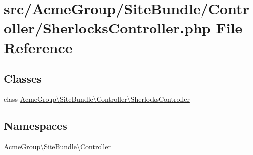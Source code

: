 \hypertarget{_sherlocks_controller_8php}{\section{src/\+Acme\+Group/\+Site\+Bundle/\+Controller/\+Sherlocks\+Controller.php File Reference}
\label{_sherlocks_controller_8php}
}
\subsection*{Classes}
\begin{DoxyCompactItemize}
\item 
class \hyperlink{class_acme_group_1_1_site_bundle_1_1_controller_1_1_sherlocks_controller}{Acme\+Group\textbackslash{}\+Site\+Bundle\textbackslash{}\+Controller\textbackslash{}\+Sherlocks\+Controller}
\end{DoxyCompactItemize}
\subsection*{Namespaces}
\begin{DoxyCompactItemize}
\item 
 \hyperlink{namespace_acme_group_1_1_site_bundle_1_1_controller}{Acme\+Group\textbackslash{}\+Site\+Bundle\textbackslash{}\+Controller}
\end{DoxyCompactItemize}

